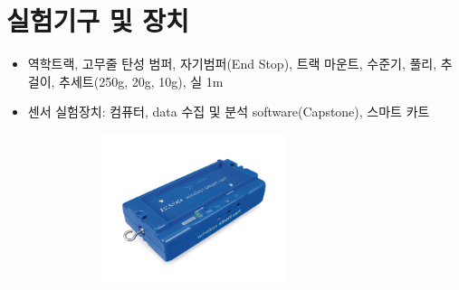 \documentclass[12pt,a4paper]{article}
\begin{document}
\section{실험기구 및 장치}
\begin{itemize}
    \item 역학트랙, 고무줄 탄성 범퍼, 자기범퍼(End Stop), 트랙 마운트, 수준기, 풀리,
        추걸이, 추세트(250g, 20g, 10g), 실 1m
    \item 센서 실험장치: 컴퓨터, data 수집 및 분석 software(Capstone), 스마트 카트
        \begin{figure}[!h]
            \centering
            \begin{subfigure}[]{0.4\textwidth}
                \centering
                \includegraphics[height=4.36cm]{ME-1241.png}
            \end{subfigure}
            \begin{subfigure}[]{0.4\textwidth}
                \centering
\end{subfigure}
\end{figure}
\end{itemize}
\end{document}
